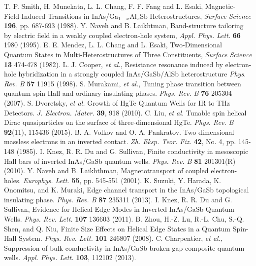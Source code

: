 \documentclass[titlepage,a4paper]{book}
\begin{document}
\begin{thebibliography}{99}
T. P. Smith, H. Munekata, L. L. Chang, F. F. Fang and L. Esaki, Magnetic-Field-Induced Transitions in InAs/Ga$_{1-x}$Al$_x$Sb Heterostructures, \textit{Surface Science} \textbf{196}, pp. 687-693 (1988).
Y. Naveh and B. Laikhtman, Band-structure tailoring by electric field in a weakly coupled electron-hole system, \textit{Appl. Phys. Lett.} \textbf{66} 1980 (1995).
E. E. Mendez, L. L. Chang and L. Esaki, Two-Dimensional Quantum States in Multi-Heterostructures of Three Constituents, \textit{Surface Science} \textbf{13} 474-478 (1982).
L. J. Cooper, \textit{et al.}, Resistance resonance induced by electron-hole hybridization in a strongly coupled InAs/GaSb/AlSb heterostructure \textit{Phys. Rev. B} \textbf{57} 11915 (1998).
S. Murakami, \textit{et al.}, Tuning phase transition between quantum spin Hall and ordinary insulating phases. \textit{Phys. Rev. B} \textbf{76} 205304 (2007).
S. Dvoretsky, \textit{et al.} Growth of HgTe Quantum Wells for IR to THz Detectors. \textit{J. Electron. Mater.} \textbf{39}, 918 (2010).
C. Liu, \textit{et al.} Tunable spin helical Dirac quasiparticles on the surface of three-dimensional HgTe. \textit{Phys. Rev. B} \textbf{92}(11), 115436 (2015). 
B. A. Volkov and O. A. Pankratov. Two-dimensional massless electrons in an inverted contact. \textit{Zh. Eksp. Teor. Fiz.} \textbf{42}, No. 4, pp. 145-148 (1985).
I. Knez, R. R. Du and G. Sullivan, Finite conductivity in mesoscopic Hall bars of inverted InAs/GaSb quantum wells. \textit{Phys. Rev. B} \textbf{81} 201301(R) (2010).
Y. Naveh and B. Laikhthman, Magnetotransport of coupled electron-holes. \textit{Europhys. Lett.} \textbf{55}, pp. 545-551 (2001).
K. Suzuki, Y. Harada, K. Onomitsu, and K. Muraki, Edge channel transport in the InAs/GaSb topological insulating phase. \textit{Phys. Rev. B} \textbf{87}  235311 (2013).
I. Knez, R. R. Du and G. Sullivan, Evidence for Helical Edge Modes in Inverted InAs/GaSb Quantum Wells. \textit{Phys. Rev. Lett.} \textbf{107} 136603 (2011).
B. Zhou, H.-Z. Lu, R.-L. Chu, S.-Q. Shen, and Q. Niu, Finite Size Effects on Helical Edge States in a Quantum Spin-Hall System. \textit{Phys. Rev. Lett.} \textbf{101} 246807 (2008).
C. Charpentier, \textit{et al.}, Suppression of bulk conductivity in InAs/GaSb broken gap composite quantum wells. \textit{Appl. Phys. Lett.} \textbf{103}, 112102 (2013).

\end{thebibliography}
\end{document}

